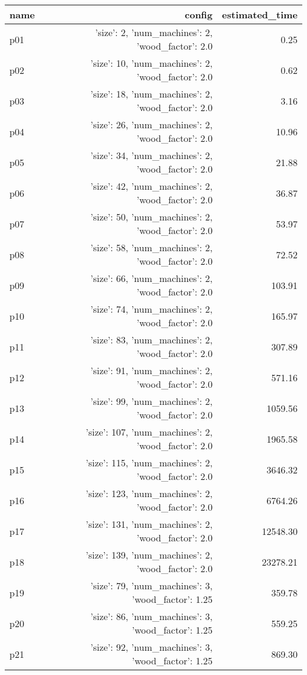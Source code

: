 \documentclass{article}
\begin{document}
                            \begin{center}
                            \scriptsize
                            \begin{tabular}{@{}l|r|r@{}}
                            name & config & estimated\_time\\\midrule
                              p01&{'size': 2, 'num\_machines': 2, 'wood\_factor': 2.0}&0.25\\
  p02&{'size': 10, 'num\_machines': 2, 'wood\_factor': 2.0}&0.62\\
  p03&{'size': 18, 'num\_machines': 2, 'wood\_factor': 2.0}&3.16\\
  p04&{'size': 26, 'num\_machines': 2, 'wood\_factor': 2.0}&10.96\\
  p05&{'size': 34, 'num\_machines': 2, 'wood\_factor': 2.0}&21.88\\
  p06&{'size': 42, 'num\_machines': 2, 'wood\_factor': 2.0}&36.87\\
  p07&{'size': 50, 'num\_machines': 2, 'wood\_factor': 2.0}&53.97\\
  p08&{'size': 58, 'num\_machines': 2, 'wood\_factor': 2.0}&72.52\\
  p09&{'size': 66, 'num\_machines': 2, 'wood\_factor': 2.0}&103.91\\
  p10&{'size': 74, 'num\_machines': 2, 'wood\_factor': 2.0}&165.97\\
  p11&{'size': 83, 'num\_machines': 2, 'wood\_factor': 2.0}&307.89\\
  p12&{'size': 91, 'num\_machines': 2, 'wood\_factor': 2.0}&571.16\\
  p13&{'size': 99, 'num\_machines': 2, 'wood\_factor': 2.0}&1059.56\\
  p14&{'size': 107, 'num\_machines': 2, 'wood\_factor': 2.0}&1965.58\\
  p15&{'size': 115, 'num\_machines': 2, 'wood\_factor': 2.0}&3646.32\\
  p16&{'size': 123, 'num\_machines': 2, 'wood\_factor': 2.0}&6764.26\\
  p17&{'size': 131, 'num\_machines': 2, 'wood\_factor': 2.0}&12548.30\\
  p18&{'size': 139, 'num\_machines': 2, 'wood\_factor': 2.0}&23278.21\\
  p19&{'size': 79, 'num\_machines': 3, 'wood\_factor': 1.25}&359.78\\
  p20&{'size': 86, 'num\_machines': 3, 'wood\_factor': 1.25}&559.25\\
  p21&{'size': 92, 'num\_machines': 3, 'wood\_factor': 1.25}&869.30\\

\end{tabular}
\end{center}
\end{document}
